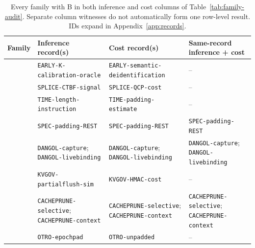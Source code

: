 \begin{table}[t]\centering\scriptsize
\caption{Every family with B in both inference and cost columns of Table~\ref{tab:family-audit}. Separate column witnesses do not automatically form one row-level result. IDs expand in Appendix~\ref{app:records}.}\label{tab:r33-crosswalk}
\begin{tabularx}{\textwidth}{@{}p{}YYY@{}}\toprule
Family & Inference record(s) & Cost record(s) & Same-record inference + cost\\\midrule
\cite{earlybird2025} & \texttt{EARLY-\allowbreak{}K-\allowbreak{}calibration-\allowbreak{}oracle} & \texttt{EARLY-\allowbreak{}semantic-\allowbreak{}deidentification} & --\\
\cite{spliceleak2026} & \texttt{SPLICE-\allowbreak{}CTBF-\allowbreak{}signal} & \texttt{SPLICE-\allowbreak{}QCP-\allowbreak{}cost} & --\\
\cite{timewilltell2024} & \texttt{TIME-\allowbreak{}length-\allowbreak{}instruction} & \texttt{TIME-\allowbreak{}padding-\allowbreak{}estimate} & --\\
\cite{wei2024speculation} & \texttt{SPEC-\allowbreak{}padding-\allowbreak{}REST} & \texttt{SPEC-\allowbreak{}padding-\allowbreak{}REST} & \texttt{SPEC-\allowbreak{}padding-\allowbreak{}REST}\\
\cite{dangol2026workflow} & \texttt{DANGOL-\allowbreak{}capture}; \texttt{DANGOL-\allowbreak{}livebinding} & \texttt{DANGOL-\allowbreak{}capture}; \texttt{DANGOL-\allowbreak{}livebinding} & \texttt{DANGOL-\allowbreak{}capture}; \texttt{DANGOL-\allowbreak{}livebinding}\\
\cite{addagada2026kvgov} & \texttt{KVGOV-\allowbreak{}partialflush-\allowbreak{}sim} & \texttt{KVGOV-\allowbreak{}HMAC-\allowbreak{}cost} & --\\
\cite{wu2026cacheprune} & \texttt{CACHEPRUNE-\allowbreak{}selective}; \texttt{CACHEPRUNE-\allowbreak{}context} & \texttt{CACHEPRUNE-\allowbreak{}selective}; \texttt{CACHEPRUNE-\allowbreak{}context} & \texttt{CACHEPRUNE-\allowbreak{}selective}; \texttt{CACHEPRUNE-\allowbreak{}context}\\
\cite{lee2026otro} & \texttt{OTRO-\allowbreak{}epochpad} & \texttt{OTRO-\allowbreak{}unpadded} & --\\
\bottomrule\end{tabularx}\end{table}

